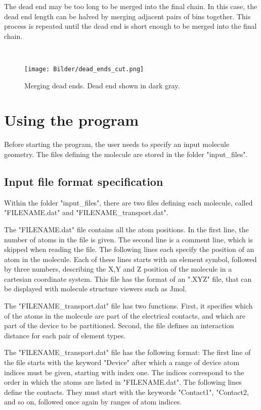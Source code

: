 \documentclass[11pt,a4paper]{article}
\begin{document}
The dead end may be too long to be merged into the final chain. In this case, the dead end length can be halved by merging adjacent pairs of bins together. This process is repeated until the dead end is short enough to be merged into the final chain. 



\

\begin{figure}[h]
   \centering
   \texttt{[image: Bilder/dead\_ends\_cut.png]}
   \caption{Merging dead ends. Dead end shown in dark gray.}
   \label{fig:dead_ends}
\end{figure}

\newpage

\section{Using the program}

Before starting the program, the user needs to specify an input molecule geometry. The files defining the molecule are stored in the folder "input\_files".

\subsection{Input file format specification}
Within the folder "input\_files", there are two files defining each molecule, called "FILENAME.dat" and "FILENAME\_transport.dat".

The "FILENAME.dat" file contains all the atom positions. In the first line, the number of atoms in the file is given. The second line is a comment line, which is skipped when reading the file. The following lines each specify the position of an atom in the molecule. Each of these lines starts with an element symbol, followed by three numbers, describing the X,Y and Z position of the molecule in a cartesian coordinate system. This file has the format of an ".XYZ" file, that can be displayed with molecule structure viewers such as Jmol.

The "FILENAME\_transport.dat" file has two functions. First, it specifies which of the atoms in the molecule are part of the electrical contacts, and which are part of the device to be partitioned. Second, the file defines an interaction distance for each pair of element types.

The "FILENAME\_transport.dat" file has the following format: The first line of the file starts with the keyword "Device" after which a range of device atom indices must be given, starting with index one. The indices correspond to the order in which the atoms are listed in "FILENAME.dat". The following lines define the contacts. They must start with the keywords "Contact1", "Contact2, and so on, followed once again by ranges of atom indices.
\end{document}
